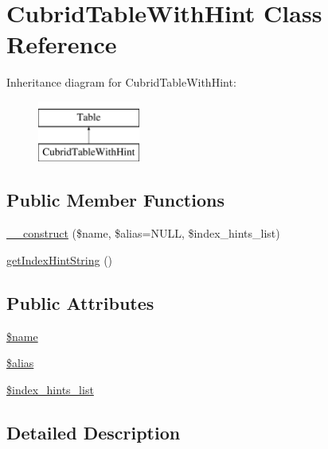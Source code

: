 \hypertarget{classCubridTableWithHint}{\section{Cubrid\-Table\-With\-Hint Class Reference}
\label{classCubridTableWithHint}
}
Inheritance diagram for Cubrid\-Table\-With\-Hint\-:\begin{figure}[H]
\begin{center}
\leavevmode
\includegraphics[height=2.000000cm]{classCubridTableWithHint}
\end{center}
\end{figure}
\subsection*{Public Member Functions}
\begin{DoxyCompactItemize}
\item 
\hyperlink{classCubridTableWithHint_a677d7448483e7a19a5f460e4daa2c838}{\-\_\-\-\_\-construct} (\$name, \$alias=N\-U\-L\-L, \$index\-\_\-hints\-\_\-list)
\item 
\hyperlink{classCubridTableWithHint_a581b44828759682ddda5ccbe7709d88b}{get\-Index\-Hint\-String} ()
\end{DoxyCompactItemize}
\subsection*{Public Attributes}
\begin{DoxyCompactItemize}
\item 
\hyperlink{classCubridTableWithHint_a29881ddda6971b68daf8719236f3b3f4}{\$name}
\item 
\hyperlink{classCubridTableWithHint_a6d3d82772e30eaaeb3f4f2cb5f137934}{\$alias}
\item 
\hyperlink{classCubridTableWithHint_abd22f208291f463ef34e7d5eeb127996}{\$index\-\_\-hints\-\_\-list}
\end{DoxyCompactItemize}


\subsection{Detailed Description}


